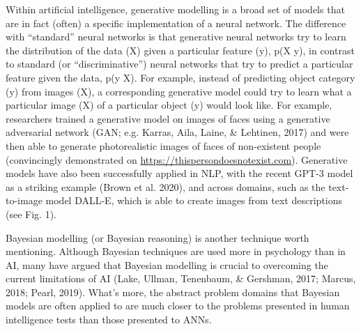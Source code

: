Within artificial intelligence, generative modelling is a broad set
of models that are in fact (often) a specific implementation of a
neural network.
The difference with ``standard'' neural networks is that generative
neural networks try to learn the distribution of the data (X) given
a particular feature (y), p(X \textbar{} y), in contrast to standard
(or ``discriminative'') neural networks that try to predict a
particular feature given the data, p(y \textbar{} X).
For example, instead of predicting object category (y) from images
(X), a corresponding generative model could try to learn what a
particular image (X) of a particular object (y) would look like.
For example, researchers trained a generative model on images of
faces using a generative adversarial network
(GAN; e.g. Karras, Aila, Laine, \& Lehtinen, 2017) and were then able
to generate photorealistic images of faces of non-existent people
(convincingly demonstrated on
\url{https://thispersondoesnotexist.com}).
Generative models have also been successfully applied in NLP,
with the recent GPT-3 model as a striking example
(Brown et al. 2020), and across domains, such as the text-to-image
model DALL-E, which is able to create images from text descriptions
(see Fig. 1).

Bayesian modelling (or Bayesian reasoning) is another technique
worth mentioning.
Although Bayesian techniques are used more in psychology than in AI,
many have argued that Bayesian modelling is crucial to overcoming
the current limitations of AI
(Lake, Ullman, Tenenbaum, \& Gershman, 2017;
Marcus, 2018; Pearl, 2019).
What's more, the abstract problem domains that Bayesian models are
often applied to are much closer to the problems presented in human
intelligence tests than those presented to ANNs.

